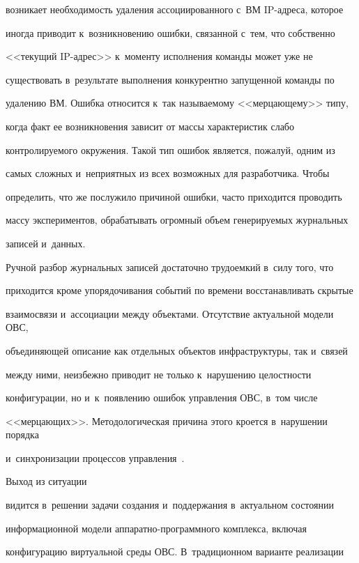 возникает необходимость удаления ассоциированного с~ВМ IP-ад\-ре\-са, которое 


иногда приводит к~возникновению ошибки, связанной с~тем, что собственно 


<<текущий IP-ад\-рес>> к~моменту исполнения команды может уже не 


существовать в~результате выполнения конкурентно запущенной команды по 


удалению ВМ. Ошибка относится к~так называемому <<мерцающему>> типу, 


когда факт ее возникновения зависит от массы характеристик слабо 


контролируемого окружения. Такой тип ошибок является, пожалуй, одним из 


самых сложных и~неприятных из всех возможных для разработчика. Чтобы 


определить, что же послужило причиной ошибки, час\-то приходится проводить 


массу экспериментов, обрабатывать огромный объем генерируемых журнальных 


записей и~данных.


   


   Ручной разбор журнальных записей достаточно трудоемкий в~силу того, что 


приходится кроме упорядочивания событий по времени восстанавливать скрытые 


взаимосвязи и~ассоциации между объектами. Отсутствие актуальной модели ОВС, 


объединяющей описание как отдельных объектов инфраструктуры, так и~связей 


между ними, неизбежно приводит не только к~нарушению це\-лост\-ности 


конфигурации, но и~к~появлению ошибок управления ОВС, в~том чис\-ле 


<<мер\-ца\-ющих>>. Методологическая причина этого кроется в~нарушении порядка 


и~синхронизации процессов управления~\cite{1-g7, 3-g7}. 





Выход из ситуации 


видится в~решении задачи создания и~поддержания в~актуальном состоянии 


информационной модели ап\-па\-рат\-но-про\-грам\-мно\-го комплекса, включая 


конфигурацию виртуальной среды ОВС. В~традиционном варианте реализации  


